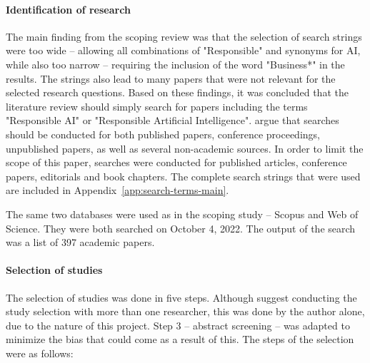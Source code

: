 \paragraph{Identification of research}
The main finding from the scoping review was that the selection of search strings were too wide -- allowing all combinations of "Responsible" and synonyms for AI, while also too narrow -- requiring the inclusion of the word "Business*" in the results. The strings also lead to many papers that were not relevant for the selected research questions. Based on these findings, it was concluded that the literature review should simply search for papers including the terms "Responsible AI" or "Responsible Artificial Intelligence". \textcite{Tranfield_2003} argue that searches should be conducted for both published papers, conference proceedings, unpublished papers, as well as several non-academic sources. In order to limit the scope of this paper, searches were conducted for published articles, conference papers, editorials and book chapters. The complete search strings that were used are included in Appendix~\ref{app:search-terms-main}. 

The same two databases were used as in the scoping study -- Scopus and Web of Science. They were both searched on October 4, 2022. The output of the search was a list of 397 academic papers.

\paragraph{Selection of studies}
The selection of studies was done in five steps. Although \textcite{Tranfield_2003} suggest conducting the study selection with more than one researcher, this was done by the author alone, due to the nature of this project. Step 3 -- abstract screening -- was adapted to minimize the bias that could come as a result of this. The steps of the selection were as follows:

